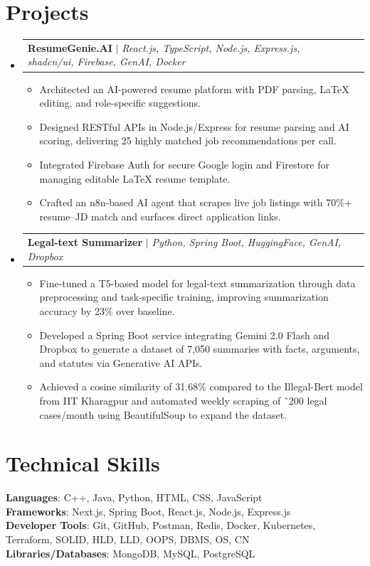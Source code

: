 \documentclass[letterpaper,11pt]{article}
\makeatletter
\newcommand{\resumeItem}[1]{
  \item\small{
    {#1 \vspace{-2pt}}
  }
}
\newcommand{\resumeProjectHeading}[2]{
    \item
    \begin{tabular*}{0.97\textwidth}{l@{\extracolsep{\fill}}r}
      \small#1 & #2 \\
    \end{tabular*}\vspace{-7pt}
}
\newcommand{\resumeSubHeadingListStart}{\begin{itemize}[leftmargin=0.15in, label={}]}
\newcommand{\resumeSubHeadingListEnd}{\end{itemize}}
\newcommand{\resumeItemListStart}{\begin{itemize}}
\newcommand{\resumeItemListEnd}{\end{itemize}\vspace{-5pt}}
\makeatother
\begin{document}
\section{Projects}
\resumeSubHeadingListStart

      \resumeProjectHeading
      {\textbf{ResumeGenie.AI} $|$ \emph{React.js, TypeScript, Node.js, Express.js, shadcn/ui, Firebase, GenAI, Docker}}{}
      \resumeItemListStart
      \resumeItem{Architected an AI-powered resume platform with PDF parsing, LaTeX editing, and role-specific suggestions.}
\resumeItem{Designed RESTful APIs in Node.js/Express for resume parsing and AI scoring, delivering 25 highly matched job recommendations per call.}
\resumeItem{Integrated Firebase Auth for secure Google login and Firestore for managing editable LaTeX resume template.}
\resumeItem{Crafted an n8n-based AI agent that scrapes live job listings with 70\%+ resume–JD match and surfaces direct application links.}
\resumeItemListEnd

      \resumeProjectHeading
      {\textbf{Legal-text Summarizer} $|$ \emph{Python, Spring Boot, HuggingFace, GenAI, Dropbox}}{}
      \resumeItemListStart
      \resumeItem{Fine-tuned a T5-based model for legal-text summarization through data preprocessing and task-specific training, improving summarization accuracy by 23\% over baseline.}
\resumeItem{Developed a Spring Boot service integrating Gemini 2.0 Flash and Dropbox to generate a dataset of 7,050 summaries with facts, arguments, and statutes via Generative AI APIs.}
\resumeItem{Achieved a cosine similarity of 31.68\% compared to the Illegal-Bert model from IIT Kharagpur and automated weekly scraping of ˜200 legal cases/month using BeautifulSoup to expand the dataset.}
\resumeItemListEnd
\resumeSubHeadingListEnd

\section{Technical Skills}
\begin{itemize}[leftmargin=0.15in, label={}]
    \small{\item{
\textbf{Languages}{: C++, Java, Python, HTML, CSS, JavaScript} \\ 
\textbf{Frameworks}{: Next.js, Spring Boot, React.js, Node.js, Express.js} \\ 
\textbf{Developer Tools}{: Git, GitHub, Postman, Redis, Docker, Kubernetes, Terraform, SOLID, HLD, LLD, OOPS, DBMS, OS, CN} \\ 
\textbf{Libraries/Databases}{: MongoDB, MySQL, PostgreSQL} 
    }}
\end{itemize}
\end{document}
